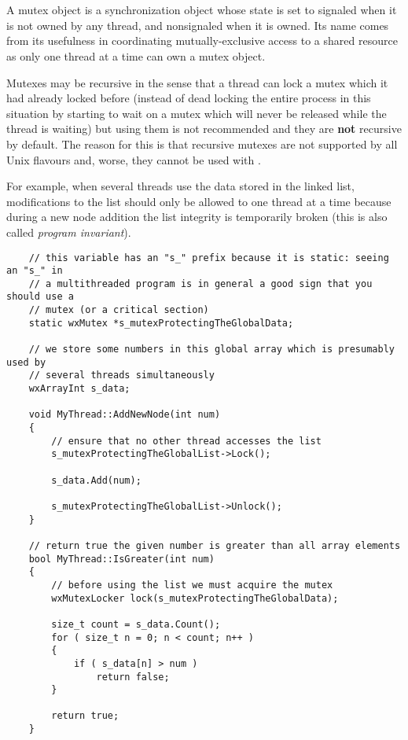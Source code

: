\section{}\label{wxmutex}

A mutex object is a synchronization object whose state is set to signaled when
it is not owned by any thread, and nonsignaled when it is owned. Its name comes
from its usefulness in coordinating mutually-exclusive access to a shared
resource as only one thread at a time can own a mutex object.

Mutexes may be recursive in the sense that a thread can lock a mutex which it
had already locked before (instead of dead locking the entire process in this
situation by starting to wait on a mutex which will never be released while the
thread is waiting) but using them is not recommended and they are {\bf not}
recursive by default. The reason for this is that recursive mutexes are not
supported by all Unix flavours and, worse, they cannot be used with 
.

For example, when several threads use the data stored in the linked list,
modifications to the list should only be allowed to one thread at a time
because during a new node addition the list integrity is temporarily broken
(this is also called {\it program invariant}).


{\small%
\begin{verbatim}
    // this variable has an "s_" prefix because it is static: seeing an "s_" in
    // a multithreaded program is in general a good sign that you should use a
    // mutex (or a critical section)
    static wxMutex *s_mutexProtectingTheGlobalData;

    // we store some numbers in this global array which is presumably used by
    // several threads simultaneously
    wxArrayInt s_data;

    void MyThread::AddNewNode(int num)
    {
        // ensure that no other thread accesses the list
        s_mutexProtectingTheGlobalList->Lock();

        s_data.Add(num);

        s_mutexProtectingTheGlobalList->Unlock();
    }

    // return true the given number is greater than all array elements
    bool MyThread::IsGreater(int num)
    {
        // before using the list we must acquire the mutex
        wxMutexLocker lock(s_mutexProtectingTheGlobalData);

        size_t count = s_data.Count();
        for ( size_t n = 0; n < count; n++ )
        {
            if ( s_data[n] > num )
                return false;
        }

        return true;
    }
\end{verbatim}
}

